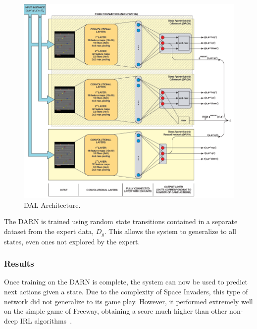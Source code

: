 \documentclass[12pt,american]{report}
\begin{document}
\begin{figure}
\centering
\includegraphics[scale=1.5]{images/darn-dal.png}
\caption{DAL Architecture.~\cite{markovikj2014deep}}
\label{fig:darn-dal}
\end{figure}
The DARN is trained using random state transitions contained in a separate dataset from the expert data, $D_g$.  This allows the system to generalize to all states, even ones not explored by the expert. 

\subsubsection{Results}
Once training on the DARN is complete, the system can now be used to predict next actions given a state. Due to the complexity of Space Invaders, this type of network did not generalize to its game play. However, it performed extremely well on the simple game of Freeway, obtaining a score much higher than other non-deep IRL algorithms~\cite{markovikj2014deep}. 
\end{document}
